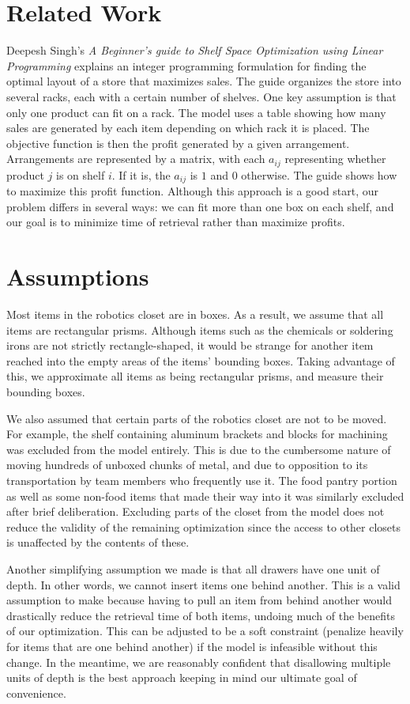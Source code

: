 \documentclass[10pt]{article}
\theoremstyle{named}
\begin{document}
\section{Related Work}
Deepesh Singh's \emph{A Beginner’s guide to Shelf Space Optimization using Linear Programming}
\cite{india} explains an integer programming formulation for finding the optimal layout
of a store that maximizes sales. The guide organizes the store into several racks, each
with a certain number of shelves. One key assumption is that only one product can fit
on a rack. The model uses a table showing how many sales are generated by each item
depending on which rack it is placed. The objective function is then the profit
generated by a given arrangement. Arrangements are represented by a matrix, with
each $a_{ij}$ representing whether product $j$ is on shelf $i$. If it is, the
$a_{ij}$ is $1$ and $0$ otherwise. The guide shows how to maximize this profit function.
Although this approach is a good start, our problem differs in several ways: we can
fit more than one box on each shelf, and our goal is to minimize time of retrieval
rather than maximize profits.


\section{Assumptions}
Most items in the robotics closet are in boxes. As a result, we assume that all
items are rectangular prisms. Although items such as the chemicals or soldering irons
are not strictly rectangle-shaped, it would be strange for another item reached into
the empty areas of the items' bounding boxes. Taking advantage of this, we approximate
all items as being rectangular prisms, and measure their bounding boxes.
\par
We also assumed that certain parts of the robotics closet are not to be moved. For example, the shelf containing aluminum brackets and blocks for machining was excluded from the model entirely. This is due to the cumbersome nature of moving hundreds of unboxed chunks of metal, and due to opposition to its transportation by team members who frequently use it. The food pantry portion as well as some non-food items that made their way into it was similarly excluded after brief deliberation. Excluding parts of the closet from the model does not reduce the validity of the remaining optimization since the access to other closets is unaffected by the contents of these.
\par
Another simplifying assumption we made is that all drawers have one unit of depth. In other words, we cannot insert items one behind another. This is a valid assumption to make because having to pull an item from behind another would drastically reduce the retrieval time of both items, undoing much of the benefits of our optimization. This can be adjusted to be a soft constraint (penalize heavily for items that are one behind another) if the model is infeasible without this change. In the meantime, we are reasonably confident that disallowing multiple units of depth is the best approach keeping in mind our ultimate goal of convenience.
\end{document}
